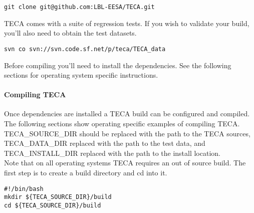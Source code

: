 \documentclass[a4paper,10pt,DIV=12]{scrreprt}
\begin{document}
\vspace{2mm}\hspace{0.2in}\begin{minipage}{0.8\textwidth}
\begin{verbatim}
git clone git@github.com:LBL-EESA/TECA.git
\end{verbatim}
\end{minipage}\vspace{2mm}

\noindent TECA comes with a suite of regression tests. If you wish to validate your build,
you'll also need to obtain the test datasets.

\vspace{2mm}\hspace{0.2in}\begin{minipage}{0.8\textwidth}
\begin{verbatim}
svn co svn://svn.code.sf.net/p/teca/TECA_data
\end{verbatim}
\end{minipage}\vspace{2mm}

\noindent Before compiling you'll need to install the dependencies. See the following sections
for operating system specific instructions.

\paragraph{Compiling TECA} Once dependencies are installed a TECA build can be configured and compiled. The
following sections show operating specific examples of compiling TECA.
TECA\_SOURCE\_DIR should be replaced with the path to the TECA sources,
TECA\_DATA\_DIR replaced with the path to the test data, and TECA\_INSTALL\_DIR
replaced with the path to the install location. \\

\noindent Note that on all operating systems TECA requires an out of source build. The first step is
to create a build directory and cd into it.

\vspace{2mm}\hspace{0.2in}\begin{minipage}{0.8\textwidth}
\begin{verbatim}
#!/bin/bash
mkdir ${TECA_SOURCE_DIR}/build
cd ${TECA_SOURCE_DIR}/build
\end{verbatim}
\end{minipage}\vspace{2mm}
\end{document}

